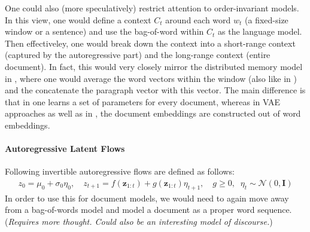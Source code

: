 \documentclass{article}
\newcommand{\z}{{\mathbf z}}
\begin{document}
One could also (more speculatively) restrict attention to order-invariant models. In this view, one would define a context $C_t$ around each word $w_t$ (a fixed-size window or a sentence) and use the bag-of-word within $C_t$ as the language model. 
Then effectiveley, one would break down the context into a short-range context (captured by the autoregressive part) and the long-range context (entire document).  In fact, this would very closely mirror the distributed memory model in \cite[Figure 2]{le2014distributed}, where one would average the word vectors within the window (also like in \cite{larochelle2012neural}) and the concatenate the paragraph vector with this vector. The main difference is that in \cite{le2014distributed} one learns a set of parameters for every document, whereas in VAE approaches as well as in \cite{larochelle2012neural}, the document embeddings are constructed out of word embeddings.

\paragraph{Autoregressive Latent Flows}

Following \cite{kingma2016improving} invertible autoregressive flows are defined as follows:
\begin{align}
z_0 = \mu_0 + \sigma_0  \eta_0, \quad z_{t+1} = f(\z_{1:t}) + g(\z_{1:t}) \eta_{t+1}, \quad g \ge 0, \;\; \eta_t \sim \mathcal N(0,\mathbf I)
\end{align}
In order to use this for document models, we would need to again move away from a bag-of-words model and model a document as a proper word sequence. (\textit{Requires more thought. Could also be an interesting model of discourse.}) 



\end{document}
